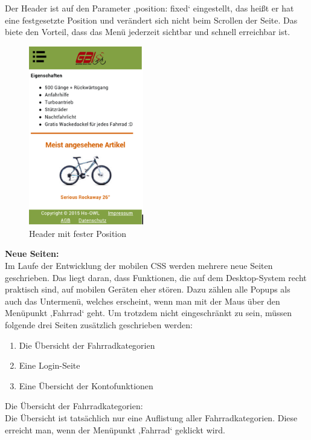 Der Header ist auf den Parameter ‚position: fixed‘ eingestellt, das heißt er hat eine festgesetzte Position und verändert sich nicht beim Scrollen der Seite. Das biete den Vorteil, dass das Menü jederzeit sichtbar und schnell erreichbar ist.

\begin{figure}[H]
\begin{center}
\includegraphics[width=5cm]{Bilder/Michael_Abbildung6-HeaderMitFesterPosition.png}
\end{center}
\caption{Header mit fester Position}
\end{figure}

\textbf{Neue Seiten:}
\\
Im Laufe der Entwicklung der mobilen CSS werden mehrere neue Seiten geschrieben. Das liegt daran, dass Funktionen, die auf dem Desktop-System recht praktisch sind, auf mobilen Geräten eher stören. Dazu zählen alle Popups als auch das Untermenü, welches erscheint, wenn man mit der Maus über den Menüpunkt ‚Fahrrad‘ geht. Um trotzdem nicht eingeschränkt zu sein, müssen folgende drei Seiten zusätzlich geschrieben werden:
\begin{enumerate}
\item Die Übersicht der Fahrradkategorien 
\item Eine Login-Seite
\item Eine Übersicht der Kontofunktionen
\end{enumerate}
Die Übersicht der Fahrradkategorien:
\\
Die Übersicht ist tatsächlich nur eine Auflistung aller Fahrradkategorien. Diese erreicht man, wenn der Menüpunkt ‚Fahrrad‘ geklickt wird. 

